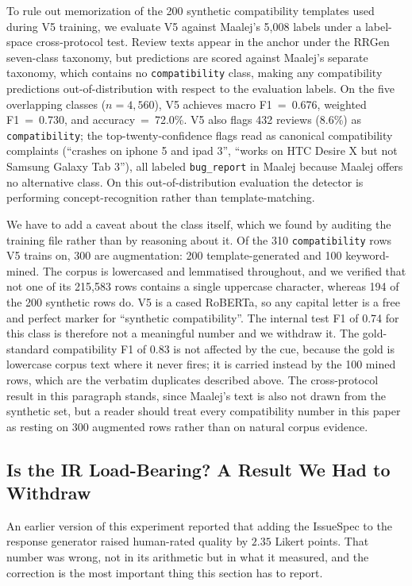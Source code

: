 \documentclass[sigconf, anonymous]{acmart}
\begin{document}
To rule out memorization of the 200 synthetic compatibility templates used during V5 training, we evaluate V5 against Maalej's 5{,}008 labels under a label-space cross-protocol test. Review texts appear in the anchor under the RRGen seven-class taxonomy, but predictions are scored against Maalej's separate taxonomy, which contains no \texttt{compatibility} class, making any compatibility predictions out-of-distribution with respect to the evaluation labels. On the five overlapping classes ($n=4{,}560$), V5 achieves macro F1~=~0.676, weighted F1~=~0.730, and accuracy~=~72.0\%. V5 also flags 432 reviews (8.6\%) as \texttt{compatibility}; the top-twenty-confidence flags read as canonical compatibility complaints (``crashes on iphone 5 and ipad 3'', ``works on HTC Desire X but not Samsung Galaxy Tab 3''), all labeled \texttt{bug\_report} in Maalej because Maalej offers no alternative class. On this
out-of-distribution evaluation the detector is performing concept-recognition rather than
template-matching.

We have to add a caveat about the class itself, which we found by auditing the training file
rather than by reasoning about it. Of the 310 \texttt{compatibility} rows V5 trains on, 300 are
augmentation: 200 template-generated and 100 keyword-mined. The corpus is lowercased and
lemmatised throughout, and we verified that not one of its 215{,}583 rows contains a single
uppercase character, whereas 194 of the 200 synthetic rows do. V5 is a cased RoBERTa, so any
capital letter is a free and perfect marker for ``synthetic compatibility''. The internal test
F1 of 0.74 for this class is therefore not a meaningful number and we withdraw it. The
gold-standard compatibility F1 of 0.83 is not affected by the cue, because the gold is lowercase
corpus text where it never fires; it is carried instead by the 100 mined rows, which are the
verbatim duplicates described above. The cross-protocol result in this paragraph stands, since
Maalej's text is also not drawn from the synthetic set, but a reader should treat every
compatibility number in this paper as resting on 300 augmented rows rather than on natural
corpus evidence.

\subsection{Is the IR Load-Bearing? A Result We Had to Withdraw}\label{exp2-results}

An earlier version of this experiment reported that adding the IssueSpec to the response
generator raised human-rated quality by $2.35$ Likert points. That number was wrong, not in its
arithmetic but in what it measured, and the correction is the most important thing this section
has to report.
\end{document}
